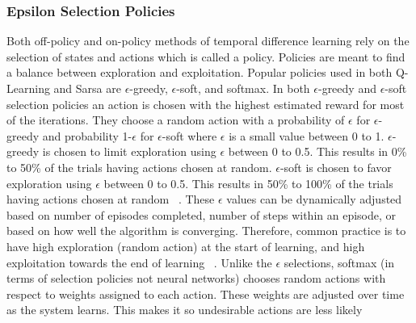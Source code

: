 \documentclass[12pt,american]{report}
\begin{document}
        \subsubsection{Epsilon Selection Policies}
        Both off-policy and on-policy methods of temporal difference learning rely on the selection of states and actions which is called a policy.  Policies are meant to find a balance between exploration and exploitation. Popular policies used in both Q-Learning and Sarsa are \begin{math}\epsilon\end{math}-greedy, \begin{math}\epsilon\end{math}-soft, and softmax.  In both \begin{math}\epsilon\end{math}-greedy and \begin{math}\epsilon\end{math}-soft selection policies an action is chosen with the highest estimated reward for most of the iterations. They choose a random action with a probability of \begin{math}\epsilon\end{math} for \begin{math}\epsilon\end{math}-greedy and probability 1-\begin{math}\epsilon\end{math} for \begin{math}\epsilon\end{math}-soft where \begin{math}\epsilon\end{math} is a small value between 0 to 1. \begin{math}\epsilon\end{math}-greedy is chosen to limit exploration using \begin{math}\epsilon\end{math} between 0 to 0.5. This results in 0\% to 50\% of the trials having actions chosen at random.  \begin{math}\epsilon\end{math}-soft is chosen to favor exploration using \begin{math}\epsilon\end{math} between 0 to 0.5. This results in 50\% to 100\% of the trials having actions chosen at random ~\cite{Eden}. These $\epsilon$ values can be dynamically adjusted based on number of episodes completed, number of steps within an episode, or based on how well the algorithm is converging.  Therefore, common practice is to have high exploration (random action) at the start of learning, and high exploitation towards the end of learning ~\cite{Greedy}.  Unlike the \begin{math}\epsilon\end{math} selections, softmax (in terms of selection policies not neural networks) chooses random actions with respect to weights assigned to each action. These weights are adjusted over time as the system learns. This makes it so undesirable actions are less likely 
\end{document}
